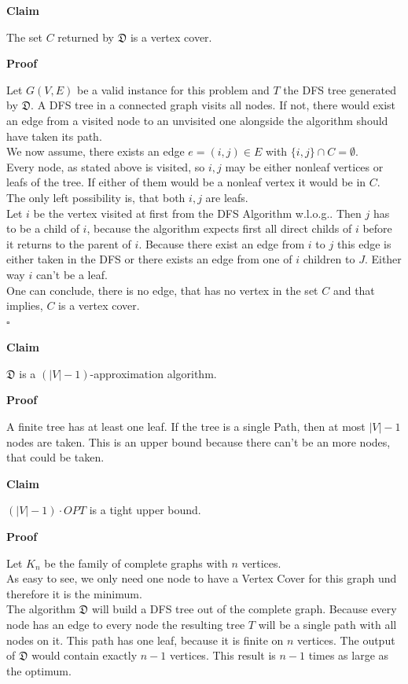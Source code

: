 \documentclass[11pt,a4paper,ngerman]{article}
\newcommand{\claim}{\addtocounter{claims}{1} \bfseries Claim \arabic{claims}}
\newcommand{\proof}{\bfseries Proof}
\begin{document}
\pagebreak
\begin{description}
	\item{\claim} The set $C$ returned by $\mathfrak{D}$ is a vertex cover.
	\item{\proof}

Let $G(V,E)$ be a valid instance for this problem and $T$ the DFS tree generated by $\mathfrak{D}$. A DFS tree in a connected graph visits all nodes. If not, there would exist an edge from a visited node to an unvisited one alongside the algorithm should have taken its path.\\

We now assume, there exists an edge $e=(i,j)\in E$ with $\{i , j\} \cap C = \emptyset$.\\
Every node, as stated above is visited, so $i,j$ may be either nonleaf vertices or leafs of the tree. If either of them would be a nonleaf vertex it would be in $C$. The only left possibility is, that both $i,j$ are leafs.\\
Let $i$ be the vertex visited at first from the DFS Algorithm w.l.o.g.. Then $j$ has to be a child of $i$, because the algorithm expects first all direct childs of $i$ before it returns to the parent of $i$. Because there exist an edge from $i$ to $j$ this edge is either taken in the DFS or there exists an edge from one of $i$ children to $J$. Either way $i$ can't be a leaf.\\

One can conclude, there is no edge, that has no vertex in the set $C$ and that implies, $C$ is a vertex cover.\\
\mbox{} \hfill $\square$  

	\item{\claim} $\mathfrak{D}$ is a $(| V | - 1)$-approximation algorithm.
	\item{\proof} 

A finite tree has at least one leaf. If the tree is a single Path, then at most $|V| - 1$ nodes are taken. This is an upper bound because there can't be an more nodes, that could be taken.

	\item{\claim} $\left( |V| - 1 \right) \cdot OPT$ is a tight upper bound.
	\item{\proof} 

Let $K_n$ be the family of complete graphs with $n$ vertices.\\
As easy to see, we only need one node to have a Vertex Cover for this graph und therefore it is the minimum.\\

The algorithm $\mathfrak{D}$ will build a DFS tree out of the complete graph. Because every node has an edge to every node the resulting tree $T$ will be a single path with all nodes on it. This path has one leaf, because it is finite on $n$ vertices. The output of $\mathfrak{D}$ would contain exactly $n-1$ vertices. This result is $n-1$ times as large as the optimum.
\end{description}

\label{LastPage}
\end{document}
